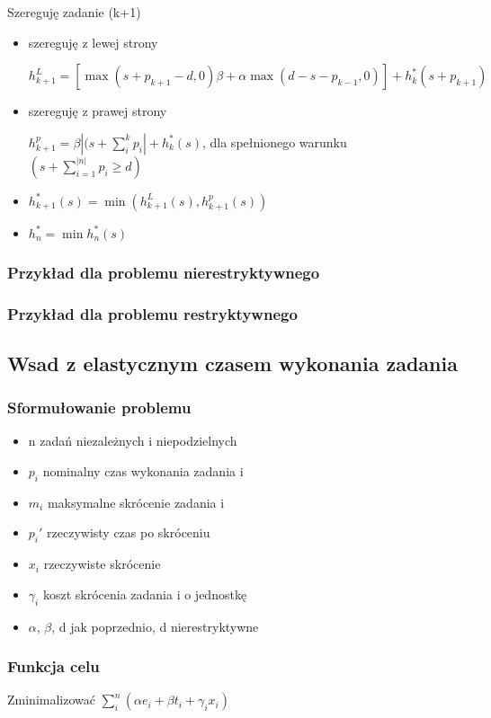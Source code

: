 \documentclass[12pt,a4paper]{article}
\begin{document}
Szereguję zadanie (k+1)
\begin{itemize}
	\item szereguję z lewej strony
	
	$h_{k+1}^{L}=[\max(s+p_{k+1}-d,0)\beta + \alpha\max(d-s-p_{k-1},0)]+h_{k}^{*}(s+p_{k+1})$
	\item szereguję z prawej strony
	
	$h_{k+1}^{p}=\beta\left | (s+\sum\limits_{i}^{k}p_{i} \right | +h_{k}^{*}(s)$, dla spełnionego warunku $(s+\sum\limits_{i=1}^{|n|}p_{i}\geq d)$
	\item $h_{k+1}^{*}(s)=\min(h_{k+1}^{L}(s), h_{k+1}^{p}(s))$
	\item $h_{n}^{*}=\min h_{n}^{*}(s)$
\end{itemize}
\subsubsection{Przykład dla problemu nierestryktywnego}
\subsubsection{Przykład dla problemu restryktywnego}

\subsection{Wsad z elastycznym czasem wykonania zadania}
\subsubsection{Sformułowanie problemu}
\begin{itemize}
\item n zadań niezależnych i niepodzielnych
\item $p_{i}$ nominalny czas wykonania zadania i
\item $m_{i}$ maksymalne skrócenie zadania i
\item $p_{i}'$ rzeczywisty czas po skróceniu
\item $x_{i}$ rzeczywiste skrócenie
\item $\gamma_{i}$ koszt skrócenia zadania i o jednostkę
\item $\alpha$, $\beta$, d jak poprzednio, d nierestryktywne
\end{itemize}
\subsubsection{Funkcja celu}
Zminimalizować $\sum\limits_{i}^{n}(\alpha e_{i}+\beta t_{i} + \gamma_{i}x_{i})$
\end{document}
